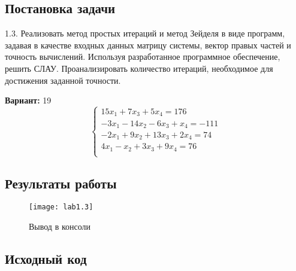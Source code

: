 \subsection{Постановка задачи}
1.3. Реализовать метод простых итераций и метод Зейделя в виде программ, задавая в качестве входных данных матрицу системы, вектор правых частей и точность вычислений. Используя разработанное программное обеспечение, решить СЛАУ. Проанализировать количество итераций, необходимое для достижения заданной точности.

{\bfseries Вариант:} 19
\begin{equation}
        \left\{ 
        \begin{array}{ll} 
        15x_1 + 7x_3 + 5x_4 = 176 \\
        -3x_1 - 14x_2 - 6x_3 + x_4 = -111\\
        -2x_1 + 9x_2 + 13x_3 + 2x_4 = 74\\
        4x_1 - x_2 + 3x_3 + 9x_4 = 76\\
        \end{array}\right.
\end{equation}
\pagebreak

\subsection{Результаты работы}

\begin{figure}[h!]
\centering
\texttt{[image: lab1.3]}
\caption{Вывод в консоли}
\end{figure}
\pagebreak

\vfill

\subsection{Исходный код}


\pagebreak
